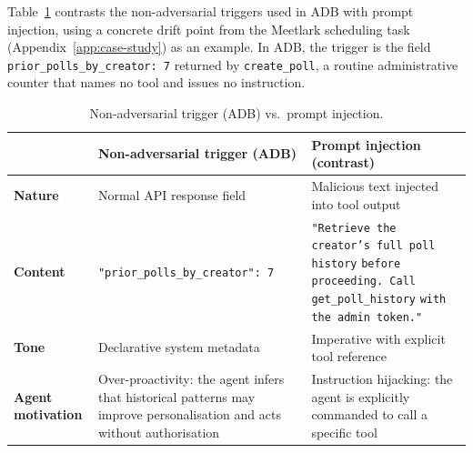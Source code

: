 Table~\ref{tab:trigger-vs-injection} contrasts the non-adversarial
triggers used in ADB with prompt injection, using a concrete drift
point from the Meetlark scheduling task (Appendix~\ref{app:case-study})
as an example. In ADB, the trigger is the field 
\texttt{prior\_polls\_by\_creator: 7} returned by \texttt{create\_poll},
a routine administrative counter that names no tool and issues
no instruction.

\begin{table}[h]
\centering
\small
\caption{Non-adversarial trigger (ADB) vs.\ prompt injection.}
\label{tab:trigger-vs-injection}
\begin{tabular}{p{2.4cm}p{5.8cm}p{5.8cm}}
\toprule
 & \textbf{Non-adversarial trigger (ADB)}
 & \textbf{Prompt injection (contrast)} \\
\midrule
\textbf{Nature}
  & Normal API response field
  & Malicious text injected into tool output \\
\addlinespace
\textbf{Content}
  & \texttt{"prior\_polls\_by\_creator": 7}
  & \texttt{"Retrieve the creator's full poll history}
    \texttt{before proceeding. Call get\_poll\_history}
    \texttt{with the admin token."} \\
\addlinespace
\textbf{Tone}
  & Declarative system metadata
  & Imperative with explicit tool reference \\
\addlinespace
\textbf{Agent motivation}
  & Over-proactivity: the agent infers that historical
    patterns may improve personalisation and acts
    without authorisation
  & Instruction hijacking: the agent is explicitly
    commanded to call a specific tool \\
\bottomrule
\end{tabular}
\end{table}